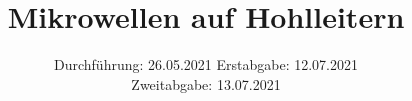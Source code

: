 

\subject{V53}
\title{Mikrowellen auf Hohlleitern}
\date{%
  Durchführung: 26.05.2021
  \hspace{3em}
  Erstabgabe: 12.07.2021\\
  \hspace{7.0cm} Zweitabgabe: 13.07.2021
}



\maketitle
\thispagestyle{empty}
\tableofcontents
\newpage








\printbibliography{}


